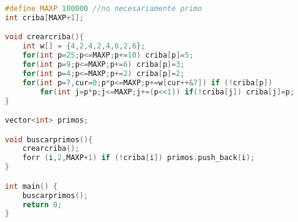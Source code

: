 \begin{lstlisting}[language=C++]
#define MAXP 100000	//no necesariamente primo
int criba[MAXP+1];

void crearcriba(){
	int w[] = {4,2,4,2,4,6,2,6};
	for(int p=25;p<=MAXP;p+=10) criba[p]=5;
	for(int p=9;p<=MAXP;p+=6) criba[p]=3; 
	for(int p=4;p<=MAXP;p+=2) criba[p]=2;
	for(int p=7,cur=0;p*p<=MAXP;p+=w[cur++&7]) if (!criba[p]) 
		for(int j=p*p;j<=MAXP;j+=(p<<1)) if(!criba[j]) criba[j]=p;
}

vector<int> primos;

void buscarprimos(){
	crearcriba();
	forr (i,2,MAXP+1) if (!criba[i]) primos.push_back(i);
}

int main() {
	buscarprimos();
	return 0;
}
\end{lstlisting}
